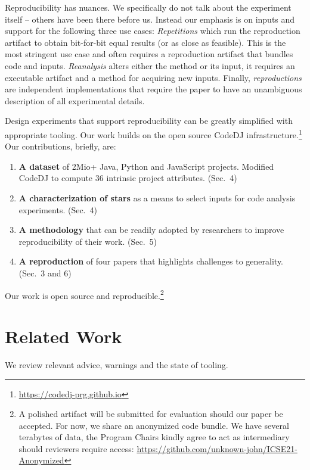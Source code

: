 \documentclass[sigconf,review,anonymous]{acmart}
\renewcommand{\dj}{{\textsf{Code{\small{DJ}}}}\xspace}
\begin{document}
\noindent
Reproducibility has nuances. We specifically do not talk about the experiment
itself -- others have been there before us. Instead our emphasis is on inputs
and support for the following three use cases: \emph{Repetitions} which run the
reproduction artifact to obtain bit-for-bit equal results (or as close as
feasible). This is the most stringent use case and often requires a reproduction
artifact that bundles code and inputs. \emph{Reanalysis} alters either the
method or its input, it requires an executable artifact and a method for
acquiring new inputs. Finally, \emph{reproductions} are independent
implementations that require the paper to have an unambiguous description of all
experimental details.

Design experiments that support reproducibility can be greatly simplified with
appropriate tooling. Our work builds on the open source \dj
infrastructure.\footnote{\url{https://codedj-prg.github.io}} Our contributions,
briefly, are:
\begin{enumerate}[leftmargin=*]
\item {\bf A dataset} of 2Mio+ Java, Python and JavaScript projects. Modified
  \dj to compute 36 intrinsic project attributes. (Sec.~4)
\item {\bf A characterization of stars} as a means to select inputs for code
  analysis experiments. (Sec.~4)
\item {\bf A methodology} that can be readily adopted by researchers to improve
  reproducibility of their work. (Sec.~5)
\item {\bf A reproduction} of four papers that highlights challenges to
  generality. (Sec.~3 and 6)
\end{enumerate}

\noindent
Our work is open source and reproducible.\footnote{A polished artifact will be
submitted for evaluation should our paper be accepted. For now, we share an
anonymized code bundle. We have several terabytes of data, the Program Chairs
kindly agree to act as intermediary should reviewers require access:
\url{https://github.com/unknown-john/ICSE21-Anonymized}}

\section{Related Work}

We review relevant advice, warnings and the state of tooling.

\newcommand{\mypara}[1]{\vspace{2mm}\noindent{\bf #1}~~}
\end{document}
